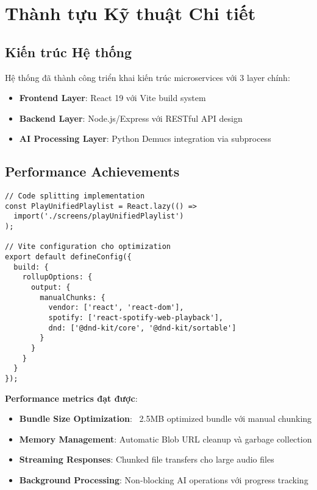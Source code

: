 \documentclass[12pt,a4paper]{article}
\begin{document}
\section{Thành tựu Kỹ thuật Chi tiết}

\subsection{Kiến trúc Hệ thống}

Hệ thống đã thành công triển khai kiến trúc microservices với 3 layer chính:
\begin{itemize}
\item \textbf{Frontend Layer}: React 19 với Vite build system
\item \textbf{Backend Layer}: Node.js/Express với RESTful API design
\item \textbf{AI Processing Layer}: Python Demucs integration via subprocess
\end{itemize}

\subsection{Performance Achievements}

\begin{lstlisting}[caption={Code splitting implementation}]
// Code splitting implementation
const PlayUnifiedPlaylist = React.lazy(() => 
  import('./screens/playUnifiedPlaylist')
);

// Vite configuration cho optimization
export default defineConfig({
  build: {
    rollupOptions: {
      output: {
        manualChunks: {
          vendor: ['react', 'react-dom'],
          spotify: ['react-spotify-web-playback'],
          dnd: ['@dnd-kit/core', '@dnd-kit/sortable']
        }
      }
    }
  }
});
\end{lstlisting}

\textbf{Performance metrics đạt được}:
\begin{itemize}
\item \textbf{Bundle Size Optimization}: ~2.5MB optimized bundle với manual chunking
\item \textbf{Memory Management}: Automatic Blob URL cleanup và garbage collection
\item \textbf{Streaming Responses}: Chunked file transfers cho large audio files
\item \textbf{Background Processing}: Non-blocking AI operations với progress tracking
\end{itemize}
\end{document}
